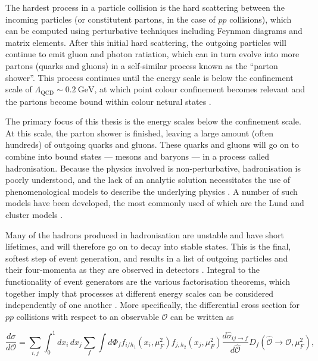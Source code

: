 \documentclass[12pt,a4paper]{report}
\begin{document}
The hardest process in a particle collision is the hard scattering between the incoming particles (or constitutent partons, in the case of $pp$ collisions), which can be computed using perturbative techniques including Feynman diagrams and matrix elements. After this initial hard scattering, the outgoing particles will continue to emit gluon and photon ratiation, which can in turn evolve into more partons (quarks and gluons) in a self-similar process known as the ``parton shower''. This process continues until the energy scale is below the confinement scale of $\Lambda_\text{QCD} \sim \qty{0.2}{\giga\electronvolt}$, at which point colour confinement becomes relevant and the partons become bound within colour netural states \cite{Bierlich:2022pfr,Buckley:2011ms}.

The primary focus of this thesis is the energy scales below the confinement scale. At this scale, the parton shower is finished, leaving a large amount (often hundreds) of outgoing quarks and gluons. These quarks and gluons will go on to combine into bound states --- mesons and baryons --- in a process called hadronisation. Because the physics involved is non-perturbative, hadronisation is poorly understood, and the lack of an analytic solution necessitates the use of phenomenological models to describe the underlying physics \cite{Bierlich:2022pfr,Skands:2012ts}. A number of such models have been developed, the most commonly used of which are the Lund \cite{Andersson:1983ia,Andersson:1997xwk} and cluster models \cite{ParticleDataGroup:2024cfk,Buckley:2011ms}.

Many of the hadrons produced in hadronisation are unstable and have short lifetimes, and will therefore go on to decay into stable states. This is the final, softest step of event generation, and results in a list of outgoing particles and their four-momenta as they are observed in detectors \cite{Bierlich:2022pfr,Buckley:2011ms}. Integral to the functionality of event generators are the various factorisation theorems, which together imply that processes at different energy scales can be considered independently of one another \cite{Collins:1981uw, Skands:2012ts}. More specifically, the differential cross section for $pp$ collisions with respect to an observable $\mathcal{O}$ can be written as

\begin{equation}
  \frac{d\sigma}{d\mathcal{O}} = \sum_{i,j} \int_0^1 dx_i \, dx_j \sum_f \int d\Phi_f f_{i/h_1}(x_i,\mu_F^2)f_{j,h_2}(x_j,\mu_F^2) \frac{d \hat{\sigma}_{ij\rightarrow f}}{d\hat{\mathcal{O}}} D_f (\hat{\mathcal{O}} \rightarrow \mathcal{O},\mu_F^2),
\end{equation}
\end{document}
